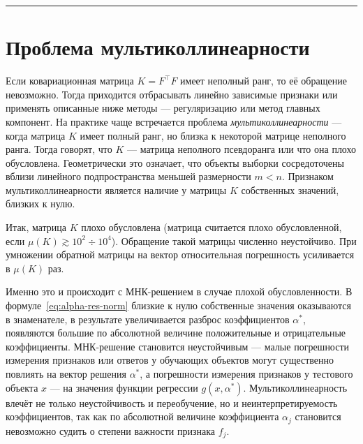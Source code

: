 \documentclass[11pt,a4paper]{article}
\renewcommand{\linethickness}{0.1ex}
\begin{document}
    \begin{center}\rule{0.5\linewidth}{\linethickness}\end{center}

    \hypertarget{ux43fux440ux43eux431ux43bux435ux43cux430-ux43cux443ux43bux44cux442ux438ux43aux43eux43bux43bux438ux43dux435ux430ux440ux43dux43eux441ux442ux438}{%
\section{Проблема
мультиколлинеарности}\label{ux43fux440ux43eux431ux43bux435ux43cux430-ux43cux443ux43bux44cux442ux438ux43aux43eux43bux43bux438ux43dux435ux430ux440ux43dux43eux441ux442ux438}}

Если ковариационная матрица \(K = F^\top F\) имеет неполный ранг, то её
обращение невозможно. Тогда приходится отбрасывать линейно зависимые
признаки или применять описанные ниже методы --- регуляризацию или метод
главных компонент. На практике чаще встречается проблема
\emph{мультиколлинеарности} --- когда матрица \(K\) имеет полный ранг,
но близка к некоторой матрице неполного ранга. Тогда говорят, что \(K\)
--- матрица неполного псевдоранга или что она плохо обусловлена.
Геометрически это означает, что объекты выборки сосредоточены вблизи
линейного подпространства меньшей размерности \(m < n\). Признаком
мультиколлинеарности является наличие у матрицы \(K\) собственных
значений, близких к нулю.

Итак, матрица \(K\) плохо обусловлена (матрица считается плохо обусловленной, если \(\mu(K) \gtrsim 10^2 \div 10^4\)).
Обращение такой матрицы численно неустойчиво.
При умножении обратной матрицы на вектор относительная
погрешность усиливается в \(\mu(K)\) раз.

Именно это и происходит с МНК-решением в случае плохой обусловленности.
В формуле~\eqref{eq:alpha-res-norm} близкие к нулю
собственные значения оказываются в знаменателе, в результате
увеличивается разброс коэффициентов \(\alpha^*\), появляются большие по
абсолютной величине положительные и отрицательные коэффициенты.
МНК-решение становится неустойчивым --- малые погрешности измерения
признаков или ответов у обучающих объектов могут существенно повлиять на
вектор решения \(\alpha^*\), а погрешности измерения признаков у
тестового объекта \(x\) --- на значения функции регрессии
\(g(x, \alpha^*)\). Мультиколлинеарность влечёт не только неустойчивость
и переобучение, но и неинтерпретируемость коэффициентов, так как по
абсолютной величине коэффициента \(\alpha_j\) становится невозможно
судить о степени важности признака \(f_j\).
\end{document}
